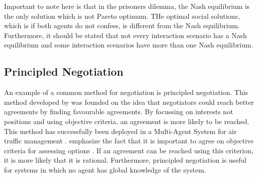 Important to note here is that in the prisoners dilemma, the Nash equilibrium is the only solution which is not Pareto optimum.  THe optimal social solutions, which is if both agents do not confess, is different from the Nash equilibrium.  Furthermore, it should be stated that not every interaction scenario has a Nash equilibrium and some interaction scenarios have more than one Nash equilibrium. 
\subsection{Principled Negotiation}
\label{sec:principlednegotiation}
An example of a common method for negotiation is principled negotiation. This method developed by \citet{fisher1987getting} was founded on the idea that negotiators could reach better agreements by finding favourable agreements. By focussing on interests not positions and using objective criteria, an agreement is more likely to be reached. This method has successfully been deployed in a Multi-Agent System for air traffic management \citep{wangermann1998principled}. \citet{fisher1987getting} emphasize the fact that it is important to agree on objective criteria for assessing options \citep{fisher1987getting}. If an agreement can be reached using this criterion, it is more likely that it is rational. Furthermore, principled negotiation is useful for systems in which no agent has global knowledge of the system. 








